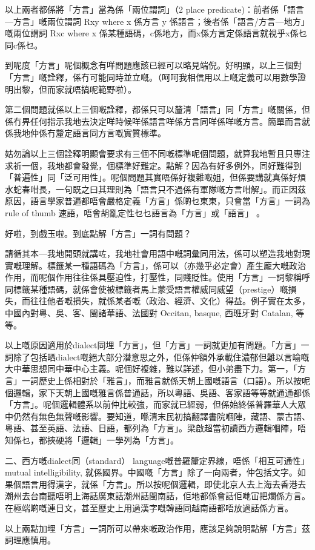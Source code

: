 以上兩者都係將「方言」當為係「兩位謂詞」（2 place predicate)：前者係「語言—方言」嘅兩位謂詞 Rxy where x 係方言 y 係語言；後者係「語言/方言—地方」嘅兩位謂詞 Rxc where x 係某種語碼，c係地方，而x係方言定係語言就視乎x係乜同c係乜。

到呢度「方言」呢個概念有咩問題應該已經可以略見端倪。好明顯，以上三個對「方言」嘅詮釋，係冇可能同時並立嘅。（呵呵我相信用以上嘅定義可以用數學證明出黎，但而家就唔搞呢範野啦）。

第二個問題就係以上三個嘅詮釋，都係只可以釐清「語言」同「方言」嘅關係，但係冇畀任何指示我地去決定咩時候咩係語言咩係方言同咩係咩嘅方言。簡單而言就係我地仲係冇釐定語言同方言嘅實質標準。

姑勿論以上三個詮釋明顯會要求有三個不同嘅標準呢個問題，就算我地暫且只專注求祈一個，我地都會發覺，個標準好難定。點解？因為有好多例外，同好難得到「普遍性」同「泛可用性」。呢個問題其實唔係好複雜嘅姐，但係要講就真係好煩水蛇春咁長，一句既之曰其理則為「語言只不過係有軍隊嘅方言咁解」。而正因茲原因，語言學家普遍都唔會嚴格定義「方言」係啲乜東東，只會當「方言」一詞為rule of thumb 速語，唔會胡亂定性乜乜語言為「方言」或「語言」 。

好啦，到戲玉啦。到底點解「方言」一詞有問題？

請循其本—我地開頭就講咗，我地社會用語中嘅詞彙同用法，係可以塑造我地對現實嘅理解。標籤某一種語碼為「方言」，係可以（亦幾乎必定會）產生龐大嘅政治作用，而呢個作用往往係具壓迫性，打壓性，同賤貶性。使用「方言」一詞黎稱呼同標籤某種語碼，就係會使被標籤者馬上蒙受語言權威同威望（prestige）嘅損失，而往往他者嘅損失，就係某者嘅（政治、經濟、文化）得益。例子實在太多，中國內對粵、吳、客、閩諸華語、法國對 Occitan, basque, 西班牙對 Catalan, 等等。

以上嘅原因適用於dialect同埋「方言」，但「方言」一詞就更加有問題。「方言」一詞除了包括晒dialect嘅絕大部分潛意思之外，佢係仲額外承載住濃郁但難以言喻嘅大中華思想同中華中心主義。呢個好複雜，難以詳述，但小弟盡下力。第一，「方言」一詞歷史上係相對於「雅言」，而雅言就係天朝上國嘅語言（口語）。所以按呢個邏輯，家下天朝上國嘅雅言係普通話，所以粵語、吳語、客家語等等就通通都係「方言」。呢個邏輯體系以前仲比較強，而家就已經弱，但係始終係普羅華人大眾中仍然有無色無聲嘅影響。要知道，喺清末民初搞翻譯書院嗰陣，藏語、蒙古語、粵語、甚至英語、法語、日語，都列為「方言」。梁啟超當初讀西方邏輯嗰陣，唔知係乜，都挾硬將「邏輯」一學列為「方言」。

二、西方嘅dialect同（standard） language嘅普羅釐定界線，唔係「相互可通性」mutual intelligibility, 就係國界。中國嘅「方言」除了一向兩者，仲包括文字。如果個語言用得漢字，就係「方言」。所以按呢個邏輯，即使北京人去上海去香港去潮州去台南聽唔明上海話廣東話潮州話閩南話，佢地都係會話佢哋冚把爛係方言。在極端啲嘅連日文，甚至歷史上用過漢字嘅韓語同越南語都唔放過話係方言。

以上兩點加埋「方言」一詞所可以帶來嘅政治作用，應該足夠說明點解「方言」茲詞理應慎用。



